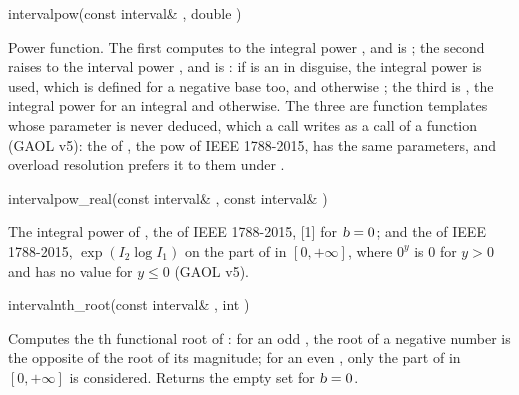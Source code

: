 \documentclass{manual}
\begin{document}
\begin{deffun}{interval}{pow}{(const interval\& , double )}
  \begin{operation}
  \end{operation}
  Power function. The first computes  to the integral power ,
  and is ; the second raises  to the
  interval power , and is : if
   is an  in disguise, the integral power is used, which is
  defined for a negative base too, and otherwise ; the third is , the integral
  power for an integral  and 
  otherwise. The three are function templates whose parameter is never
  deduced, which a call writes as a call of a function (GAOL v5): the
   of , the pow of IEEE 1788-2015, has the same
  parameters, and overload resolution prefers it to them under
  .
\end{deffun}

\begin{deffun}{interval}{pow\_real}{(const interval\& , const interval\& )}
  \begin{operation}
  \end{operation}
  The integral power of , the  of IEEE 1788-2015, [1] for
  $\textsl{b}=0$; and the  of IEEE 1788-2015, $\exp(I_2\log I_1)$ on the
  part of  in $[0,+\infty]$, where $0^y$ is 0 for $y>0$ and has no value
  for $y\le 0$ (GAOL v5).
\end{deffun}

\begin{deffun}{interval}{nth\_root}{(const interval\& , int )}
  \begin{operation}
  \end{operation}
  Computes the th functional root of : for an odd , the
  root of a negative number is the opposite of the root of its magnitude; for an
  even , only the part of  in $[0,+\infty]$ is considered.
  Returns the empty set for $\textsl{b}=0$.
\end{deffun}
\end{document}
